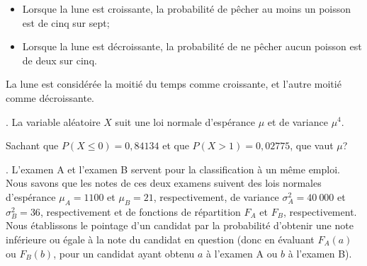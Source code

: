 \begin{questions}
\begin{itemize}
    \item Lorsque la lune est croissante, la probabilité de pêcher au moins un poisson est de cinq sur sept;
    \item Lorsque la lune est décroissante, la probabilité de ne pêcher aucun poisson est de deux sur cinq.
\end{itemize}
La lune est considérée la moitié du temps comme croissante, et l'autre moitié comme décroissante.

\vspace{1cm}



\newpage . \newpage
\question[10] \label{CDF} La variable aléatoire $X$ suit une loi normale d'espérance $\mu$ et de variance $\mu^4$.

Sachant que $P(X\leq 0)= 0,84134$ et que $P(X> 1)= 0,02775$, que vaut $\mu$?

\newpage . \newpage
\question
L'examen A et l'examen B servent pour la classification à un même emploi. 
Nous savons que les notes de ces deux examens suivent des lois normales d'espérance $\mu_{A}=1100$ et $\mu_{B}=21$, respectivement, de variance $\sigma^2_{A}=40\ 000$ et $\sigma^2_{B}=36$, respectivement et de fonctions de répartition $F_A$ et $F_B$, respectivement.
Nous établissons le pointage d'un candidat par la probabilité d'obtenir une note inférieure ou égale à la note du candidat en question (donc en évaluant $F_A(a)$ ou $F_B(b)$, pour un candidat ayant obtenu $a$ à l'examen A ou $b$ à l'examen B). 


\end{questions}
